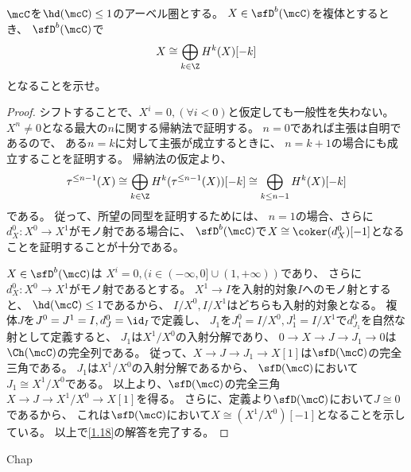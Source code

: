 \documentclass[uplatex,dvipdfmx]{jsarticle}
\begin{document}
\maketitle
\HeaderCommentA
\section{}
\fi


\begin{prob}\label{1.18}
  \(\mcC\)を\(\hd(\mcC) \leq 1\)のアーベル圏とする。
  \(X\in \sfD^b(\mcC)\)を複体とするとき、
  \(\sfD^b(\mcC)\)で
  \[
  X\cong \bigoplus_{k\in \Z}H^k(X)[-k]
  \]
  となることを示せ。
\end{prob}

\begin{proof}
  シフトすることで、\(X^i = 0 ,(\forall i < 0)\)と仮定しても一般性を失わない。
  \(X^n \neq 0\)となる最大の\(n\)に関する帰納法で証明する。
  \(n=0\)であれば主張は自明であるので、
  ある\(n=k\)に対して主張が成立するときに、
  \(n=k+1\)の場合にも成立することを証明する。
  帰納法の仮定より、
  \[
  \tau^{\leq n-1}(X)\cong \bigoplus_{k\in \Z}H^k(\tau^{\leq n-1}(X))[-k]
  \cong \bigoplus_{k\leq n-1}H^k(X)[-k]
  \]
  である。
  従って、所望の同型を証明するためには、
  \(n=1\)の場合、さらに\(d_X^0:X^0\to X^1\)がモノ射である場合に、
  \(\sfD^b(\mcC)\)で\(X\cong \coker(d_X^0)[-1]\)となることを証明することが十分である。

  \(X\in \sfD^b(\mcC)\)は
  \(X^i = 0, (i\in (-\infty,0]\cup (1,+\infty))\)であり、
  さらに\(d_X^0:X^0\to X^1\)がモノ射であるとする。
  \(X^1\to I\)を入射的対象\(I\)へのモノ射とすると、
  \(\hd(\mcC)\leq 1\)であるから、
  \(I/X^0,I/X^1\)はどちらも入射的対象となる。
  複体\(J\)を\(J^0=J^1=I, d_J^0 = \id_I\)で定義し、
  \(J_1\)を\(J_1^0=I/X^0,J_1^1=I/X^1\)で\(d_{J_1}^0\)を自然な射として定義すると、
  \(J_1\)は\(X^1/X^0\)の入射分解であり、
  \(0\to X \to J \to J_1 \to 0\)は\(\Ch(\mcC)\)の完全列である。
  従って、\(X\to J\to J_1\to X[1]\)は\(\sfD(\mcC)\)の完全三角である。
  \(J_1\)は\(X^1/X^0\)の入射分解であるから、
  \(\sfD(\mcC)\)において\(J_1\cong X^1/X^0\)である。
  以上より、\(\sfD(\mcC)\)の完全三角\(X\to J \to X^1/X^0\to X[1]\)を得る。
  さらに、定義より\(\sfD(\mcC)\)において\(J\cong 0\)であるから、
  これは\(\sfD(\mcC)\)において\(X\cong (X^1/X^0)[-1]\)となることを示している。
  以上で\autoref{1.18}の解答を完了する。
\end{proof}


\ifcsname Chap\endcsname\else
\printbibliography
\end{document}
